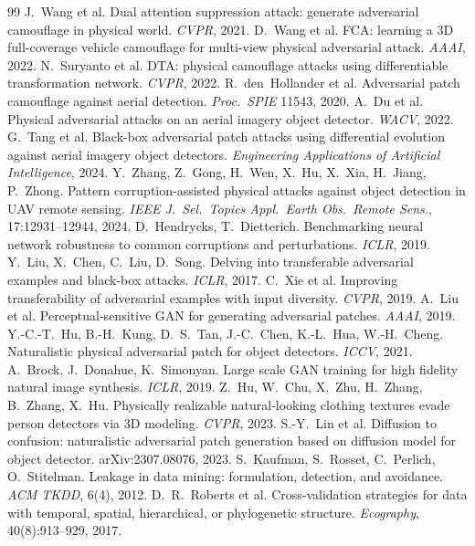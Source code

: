 \documentclass[11pt,a4paper]{article}
\begin{document}
\begin{thebibliography}{99}
 J.~Wang et al. Dual attention suppression attack: generate adversarial camouflage in physical world. \emph{CVPR}, 2021.
 D.~Wang et al. FCA: learning a 3D full-coverage vehicle camouflage for multi-view physical adversarial attack. \emph{AAAI}, 2022.
 N.~Suryanto et al. DTA: physical camouflage attacks using differentiable transformation network. \emph{CVPR}, 2022.
 R.~den~Hollander et al. Adversarial patch camouflage against aerial detection. \emph{Proc.\ SPIE} 11543, 2020.
 A.~Du et al. Physical adversarial attacks on an aerial imagery object detector. \emph{WACV}, 2022.
 G.~Tang et al. Black-box adversarial patch attacks using differential evolution against aerial imagery object detectors. \emph{Engineering Applications of Artificial Intelligence}, 2024.
 Y.~Zhang, Z.~Gong, H.~Wen, X.~Hu, X.~Xia, H.~Jiang, P.~Zhong. Pattern corruption-assisted physical attacks against object detection in UAV remote sensing. \emph{IEEE J.\ Sel.\ Topics Appl.\ Earth Obs.\ Remote Sens.}, 17:12931--12944, 2024.
 D.~Hendrycks, T.~Dietterich. Benchmarking neural network robustness to common corruptions and perturbations. \emph{ICLR}, 2019.
 Y.~Liu, X.~Chen, C.~Liu, D.~Song. Delving into transferable adversarial examples and black-box attacks. \emph{ICLR}, 2017.
 C.~Xie et al. Improving transferability of adversarial examples with input diversity. \emph{CVPR}, 2019.
 A.~Liu et al. Perceptual-sensitive GAN for generating adversarial patches. \emph{AAAI}, 2019.
 Y.-C.-T.~Hu, B.-H.~Kung, D.~S.~Tan, J.-C.~Chen, K.-L.~Hua, W.-H.~Cheng. Naturalistic physical adversarial patch for object detectors. \emph{ICCV}, 2021.
 A.~Brock, J.~Donahue, K.~Simonyan. Large scale GAN training for high fidelity natural image synthesis. \emph{ICLR}, 2019.
 Z.~Hu, W.~Chu, X.~Zhu, H.~Zhang, B.~Zhang, X.~Hu. Physically realizable natural-looking clothing textures evade person detectors via 3D modeling. \emph{CVPR}, 2023.
 S.-Y.~Lin et al. Diffusion to confusion: naturalistic adversarial patch generation based on diffusion model for object detector. arXiv:2307.08076, 2023.
 S.~Kaufman, S.~Rosset, C.~Perlich, O.~Stitelman. Leakage in data mining: formulation, detection, and avoidance. \emph{ACM TKDD}, 6(4), 2012.
 D.~R.~Roberts et al. Cross-validation strategies for data with temporal, spatial, hierarchical, or phylogenetic structure. \emph{Ecography}, 40(8):913--929, 2017.

\end{thebibliography}
\end{document}

